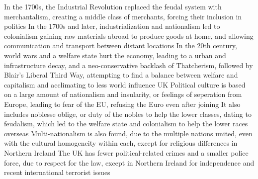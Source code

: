 \documentclass[11 pt, twoside]{article}
\newenvironment{outline*}
{
	\begin{outline}[enumerate]
	}
	{\end{outline}
}
\begin{document}
\begin{outline*}
\2 In the 1700s, the Industrial Revolution replaced the feudal system with merchantalism, creating a middle class of merchants, forcing their inclusion in politics
\2 In the 1700s and later, industrialization and nationalism led to colonialism gaining raw materials abroad to produce goods at home, and allowing communication and transport between distant locations
\2 In the 20th century, world wars and a welfare state hurt the economy, leading to a urban and infrastructure decay, and a neo-conservative backlash of Thatcherism, followed by Blair's Liberal Third Way, attempting to find a balance between welfare and capitalism and acclimating to less world influence
\1 UK Political culture is based on a large amount of nationalism and insularity, or feelings of seperation from Europe, leading to fear of the EU, refusing the Euro even after joining
\2 It also includes noblesse oblige, or duty of the nobles to help the lower classes, dating to feudalism, which led to the welfare state and colonialism to help the lower races overseas
\2 Multi-nationalism is also found, due to the multiple nations united, even with the cultural homogeneity within each, except for religious differences in Northern Ireland
\1 The UK has fewer political-related crimes and a smaller police force, due to respect for the law, except in Northern Ireland for independence and recent international terrorist issues
\end{outline*}
\end{document}
